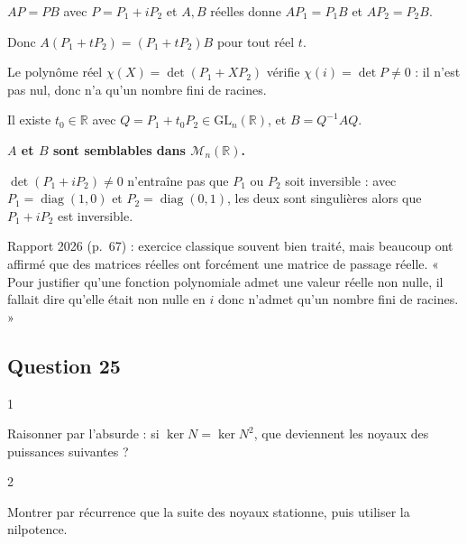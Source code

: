\documentclass[11pt,a4paper]{article}
\begin{document}
\(AP=PB\) avec \(P=P_1+iP_2\) et \(A,B\) réelles donne \(AP_1=P_1B\) et \(AP_2=P_2B\).

Donc \(A(P_1+tP_2)=(P_1+tP_2)B\) pour tout réel \(t\).

Le polynôme réel \(\chi(X)=\det(P_1+XP_2)\) vérifie \(\chi(i)=\det P\neq0\) : il n'est pas nul, donc n'a qu'un nombre fini de racines.

Il existe \(t_0\in\mathbb{R}\) avec \(Q=P_1+t_0P_2\in{\mathrm{GL}}_n(\mathbb{R})\), et \(B=Q^{-1}AQ\).

\textbf{\(A\) et \(B\) sont semblables dans \({\mathcal{M}}_n(\mathbb{R})\).}

\begin{piege}

\(\det(P_1+iP_2)\neq0\) n'entraîne pas que \(P_1\) ou \(P_2\) soit inversible : avec \(P_1=\operatorname{diag}(1,0)\) et \(P_2=\operatorname{diag}(0,1)\), les deux sont singulières alors que \(P_1+iP_2\) est inversible.

\end{piege}

\begin{jury}

Rapport 2026 (p.~67) : exercice classique souvent bien traité, mais beaucoup ont affirmé que des matrices réelles ont forcément une matrice de passage réelle. « Pour justifier qu'une fonction polynomiale admet une valeur réelle non nulle, il fallait dire qu'elle était non nulle en \(i\) donc n'admet qu'un nombre fini de racines. »

\end{jury}

\hypertarget{question-25}{%
\subsection{Question 25}\label{question-25}}

\begin{indication}{1}

Raisonner par l'absurde : si \(\ker N=\ker N^2\), que deviennent les noyaux des puissances suivantes ?

\end{indication}

\begin{indication}{2}

Montrer par récurrence que la suite des noyaux stationne, puis utiliser la nilpotence.

\end{indication}
\end{document}
